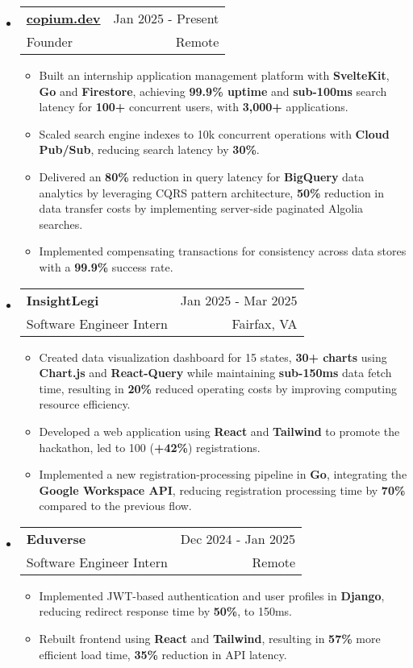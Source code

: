 \documentclass[letterpaper,11pt]{article}
\makeatletter
\newcommand{\resumeItem}[1]{
  \item{
    {#1}
  }
}
\newcommand{\resumeSubheading}[4]{
    \item
    \begin{tabular*}{0.985\textwidth}[t]{l@{\extracolsep{\fill}}r@{\hspace{-0.1in}}}
        {\textbf{#1}} & {#2} \\
        #3 &  #4 \\
    \end{tabular*}\vspace{-5pt}
}
\newcommand{\resumeSubHeadingListStart}{\begin{itemize}[leftmargin=0.00in, rightmargin=-0.2in, label={}]\vspace{3pt}}
\newcommand{\resumeSubHeadingListEnd}{\end{itemize}\vspace{-5pt}}
\newcommand{\resumeItemListStart}{\vspace{3pt}\begin{itemize}[leftmargin=0.15in, rightmargin=0.15in]}
\newcommand{\resumeItemListEnd}{\end{itemize}\vspace{-5pt}}
\makeatother
\begin{document}
\resumeSubHeadingListStart
\resumeSubheading
{\href{https://www.copium.dev}{copium.dev}} {Jan 2025 - Present}
{Founder} {Remote}
\resumeItemListStart 
\resumeItem{Built an internship application management platform with \textbf{SvelteKit}, \textbf{Go} and \textbf{Firestore}, achieving \textbf{99.9\% uptime} and \textbf{sub-100ms} search latency for \textbf{100+} concurrent users, with \textbf{3,000+} applications.}
\resumeItem{Scaled search engine indexes to 10k concurrent operations with \textbf{Cloud Pub/Sub}, reducing search latency by \textbf{30\%}.}
\resumeItem{Delivered an \textbf{80\%} reduction in query latency for \textbf{BigQuery} data analytics by leveraging CQRS pattern architecture, \textbf{50\%} reduction in data transfer costs by implementing server-side paginated Algolia searches.}
\resumeItem{Implemented compensating transactions for consistency across data stores with a \textbf{99.9\%} success rate.}
\resumeItemListEnd
\resumeSubHeadingListEnd

\resumeSubHeadingListStart
\resumeSubheading
{InsightLegi} {Jan 2025 - Mar 2025}
{Software Engineer Intern} {Fairfax, VA}
\resumeItemListStart 
\resumeItem{Created data visualization dashboard for 15 states, \textbf{30+ charts} using \textbf{Chart.js} and \textbf{React-Query} while maintaining \textbf{sub-150ms} data fetch time, resulting in \textbf{20\%} reduced operating costs by improving computing resource efficiency.}
\resumeItem{Developed a web application using \textbf{React} and \textbf{Tailwind} to promote the hackathon, led to 100 (\textbf{+42\%}) registrations.}
\resumeItem{Implemented a new registration-processing pipeline in \textbf{Go}, integrating the \textbf{Google Workspace API}, reducing registration processing time by \textbf{70\%} compared to the previous flow.}
\resumeItemListEnd
\resumeSubHeadingListEnd

\resumeSubHeadingListStart
\resumeSubheading
{Eduverse} {Dec 2024 - Jan 2025}
{Software Engineer Intern} {Remote}
\resumeItemListStart
\resumeItem{Implemented JWT-based authentication and user profiles in \textbf{Django}, reducing redirect response time by \textbf{50\%}, to 150ms.}
\resumeItem{Rebuilt frontend using \textbf{React} and \textbf{Tailwind}, resulting in \textbf{57\%} more efficient load time, \textbf{35\%} reduction in API latency.}
\resumeItemListEnd
\resumeSubHeadingListEnd

\end{document}
